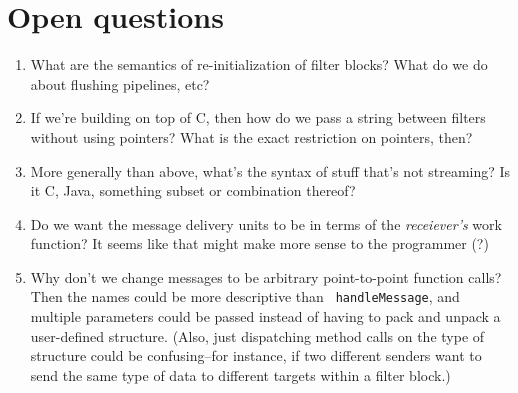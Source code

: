 \section{Open questions}

\begin{enumerate}

\item What are the semantics of re-initialization of filter blocks?
What do we do about flushing pipelines, etc?

\item If we're building on top of C, then how do we pass a string
between filters without using pointers?  What is the exact restriction
on pointers, then?

\item More generally than above, what's the syntax of stuff that's not
streaming?  Is it C, Java, something subset or combination thereof?

\item Do we want the message delivery units to be in terms of the {\it
receiever's} work function?  It seems like that might make more sense
to the programmer (?)

\item Why don't we change messages to be arbitrary point-to-point
function calls?  Then the names could be more descriptive than {\tt
handleMessage}, and multiple parameters could be passed instead of
having to pack and unpack a user-defined structure.  (Also, just
dispatching method calls on the type of structure could be
confusing--for instance, if two different senders want to send the
same type of data to different targets within a filter block.)

\end{enumerate}

